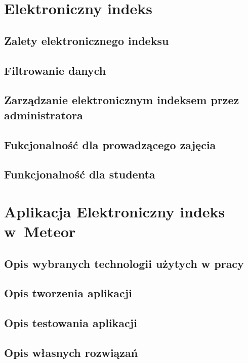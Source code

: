 \documentclass[brudnopis]{xmgr}
\begin{document}
\chapter{Elektroniczny indeks}

\section{Zalety elektronicznego indeksu} 

\section{Filtrowanie danych}

\section{Zarządzanie elektronicznym indeksem przez administratora}

\section{Fukcjonalność dla prowadzącego zajęcia}

\section{Funkcjonalność dla studenta}

\chapter{Aplikacja Elektroniczny indeks w~Meteor}

\section{Opis wybranych technologii użytych w pracy}

\section{Opis tworzenia aplikacji}
\cite{Introduction}
\cite{MeteorDocs}
\cite{DiscoverMeteor2013}
\cite{NodeDocs}
\cite{MongoDocs}
\cite{ScalingMongoDB2011}
\cite{ScalingWithMongoDB}
\section{Opis testowania aplikacji}
\cite{Laika}
\section{Opis własnych rozwiązań}
\end{document}
